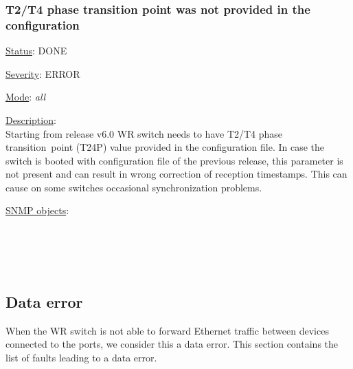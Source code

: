 \subsubsection{\bf T2/T4 phase transition point was not provided in the configuration}
		\label{fail:timing:t24p}
		\begin{pck_descr}
			\item [] \underline{Status}: DONE
			\item [] \underline{Severity}: ERROR
			\item [] \underline{Mode}: \emph{all}
			\item [] \underline{Description}:\\
				Starting from release v6.0 WR switch needs to have T2/T4 phase transition\
				point (T24P) value provided in the configuration file. In case the switch
				is booted with configuration file of the previous release, this parameter
				is not present and can result in wrong correction of reception timestamps.
				This can cause on some switches occasional synchronization problems.
			\item [] \underline{SNMP objects}:\\
				{\footnotesize
				\\
				\\
				\\
				 \\
				 }
		\end{pck_descr}

\newpage
\subsection{Data error}
When the WR switch is not able to forward Ethernet traffic between devices
connected to the ports, we consider this a data error. This section contains the
list of faults leading to a data error.

